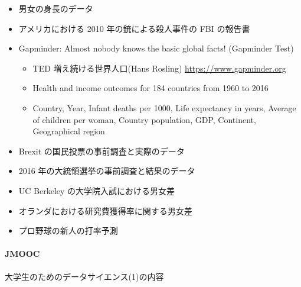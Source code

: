 \documentclass[
]{book}
\providecommand{\tightlist}{%
  \setlength{\itemsep}{0pt}\setlength{\parskip}{0pt}}
\theoremstyle{definition}
\theoremstyle{definition}
\theoremstyle{definition}
\theoremstyle{definition}
\theoremstyle{remark}
\begin{document}
\begin{itemize}
\tightlist
\item
  男女の身長のデータ
\item
  アメリカにおける 2010 年の銃による殺人事件の FBI の報告書
\item
  Gapminder: Almost nobody knows the basic global facts! (Gapminder Test)

  \begin{itemize}
  \tightlist
  \item
    TED 増え続ける世界人口(Hans Rosling) \url{https://www.gapminder.org}
  \item
    Health and income outcomes for 184 countries from 1960 to 2016
  \item
    Country, Year, Infant deaths per 1000, Life expectancy in years, Average of children per woman,
    Country population, GDP, Continent, Geographical region
  \end{itemize}
\item
  Brexit の国民投票の事前調査と実際のデータ
\item
  2016 年の大統領選挙の事前調査と結果のデータ
\item
  UC Berkeley の大学院入試における男女差
\item
  オランダにおける研究費獲得率に関する男女差
\item
  プロ野球の新人の打率予測
\end{itemize}

\hypertarget{jmooc}{%
\paragraph{JMOOC}\label{jmooc}}

大学生のためのデータサイエンス(1)の内容
\end{document}
